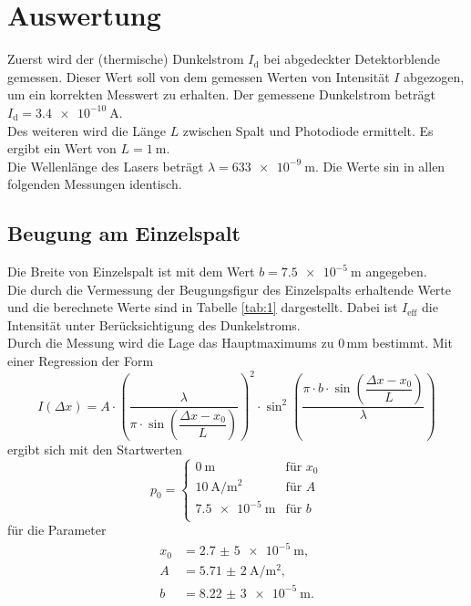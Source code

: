 \section{Auswertung}
\label{sec:Auswertung}
Zuerst wird der (thermische) Dunkelstrom  $I_\text{d}$ bei abgedeckter Detektorblende gemessen. 
Dieser Wert soll von dem gemessen Werten von Intensität $I$ abgezogen, um ein korrekten Messwert zu erhalten.
Der gemessene Dunkelstrom beträgt $I_{\text{d}} =\SI{3,4e-10}{\ampere}$.\\
Des weiteren wird die Länge $L$ zwischen Spalt und Photodiode ermittelt. 
 Es ergibt ein Wert von \(L=\SI{1}{\metre}\).\\
Die Wellenlänge des Lasers beträgt $\lambda = \SI{633e-9}{\metre}$.
Die Werte sin in allen folgenden Messungen identisch.
\subsection{Beugung am Einzelspalt}
Die Breite von Einzelspalt ist mit dem Wert $b = \SI{7,5e-5}{\metre}$ angegeben.\\
Die durch die Vermessung der Beugungsfigur des  Einzelspalts erhaltende Werte und die berechnete Werte sind in Tabelle \ref{tab:1} dargestellt.
 Dabei ist $I_{\text{eff}}$ die Intensität unter Berücksichtigung des Dunkelstroms.\\
 Durch die Messung wird die Lage das Hauptmaximums zu $0\, \text{mm}$  bestimmt.
Mit einer Regression der Form 
\[
I(\Delta x)=A\cdot\left(
\frac{\lambda}{\pi \cdot \sin{\left(\dfrac{\Delta x-x_0}{L}\right)}}\right)^2\cdot\sin^2{\left(\frac{\pi \cdot b \cdot \sin{\left(\dfrac{\Delta x-x_0}{L}\right)}}{\lambda}\right)}
\]
ergibt sich mit den Startwerten
\begin{equation*}
p_0=
\begin{cases}
\SI{0}{\metre} 					& \text{für } x_0\\
\SI{10}{\ampere\per\metre\squared}	& \text{für } A\\
\SI{7,5e-5}{\metre}					& \text{für } b\\
\end{cases}
\end{equation*}
für die Parameter
\begin{align*}
x_0&= \SI{2,7(5)e-5}{\metre}\text{,} \\
A	&= \SI{5,71(2)}{\ampere\per\metre\squared}\text{,} \\
b   &= \SI{8,22(3)e-5}{\metre}\text{.} \\
\end{align*}
